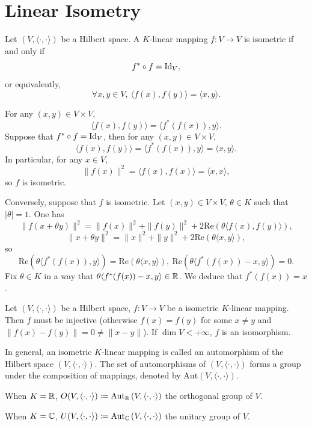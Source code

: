 \section{Linear Isometry}

\begin{propositionenv}
    Let $(V,\langle\cdot,\cdot\rangle)$ be a Hilbert space.
    A $K$-linear mapping $f : V\rightarrow V$ is isometric if and only if
    $$ f^*\circ f = \operatorname{\mathrm{Id}}_V,$$
    or equivalently, 
    $$ \forall x,y\in V, \ \langle f(x),f(y)\rangle = \langle x,y\rangle.$$
\end{propositionenv}
\begin{proofenv}
    For any $(x,y)\in V\times V$,
    $$ \langle f(x),f(y)\rangle = \langle f^*(f(x)),y\rangle .$$
    Suppose that $f^*\circ f = \operatorname{\mathrm{Id}}_V$, then for any $(x,y)\in V\times V$,
    $$ \langle f(x),f(y)\rangle = \langle f^*(f(x)),y\rangle = \langle x,y\rangle.$$
    In particular, for any $x\in V$, 
    $$ \| f(x)\|^2 = \langle f(x),f(x)\rangle = \langle x,x\rangle,$$
    so $f$ is isometric.

    \quad Conversely, suppose that $f$ is isometric.
    Let $(x,y)\in V\times V$, $\theta \in K$ such that $|\theta| = 1$.
    One has
    $$ \|f(x+\theta y)\|^2 = \|f(x)\|^2 + \|f(y)\|^2 + 2 \mathrm{Re} \left(\theta \langle f(x),f(y)\rangle\right),$$
    $$ \| x+ \theta y\|^2 = \|x\|^2 + \|y \|^2 + 2 \mathrm{Re} \left(\theta \langle x,y\rangle\right),$$
    so 
    $$ \mathrm{Re} \left(\theta \langle f^*(f(x)),y \rangle\right) = \mathrm{Re}(\theta\langle x,y\rangle),\ \mathrm{Re} \left(\theta \langle f^*(f(x)) - x,y\rangle\right) = 0.$$
    Fix $\theta\in K$ in a way that $\theta \langle f^*(f(x)) - x,y\rangle \in \mathbb{R}$.
    We deduce that $f^*(f(x)) = x$.
\end{proofenv}

\begin{remark}
    Let $(V,\langle\cdot,\cdot\rangle)$ be a Hilbert space,
    $f: V\rightarrow V$ be a isometric $K$-linear mapping.
    Then $f$ must be injective (otherwise $f(x) = f(y)$ for some $x\neq y$ and $\| f(x) - f(y)\| = 0 \neq \|x - y\|$).
    If $\dim V < +\infty$, $f$ is an isomorphism.
    
    \quad In general, an isometric $K$-linear mapping is called an automorphism of the Hilbert space $\left(V, \langle\cdot, \cdot\rangle\right)$.
    The set of automorphisms of $\left(V, \langle\cdot, \cdot\rangle\right)$ forms a group under the composition of mappings, denoted by $\mathrm{Aut}\left(V, \langle\cdot, \cdot\rangle\right)$.
    
    \quad When $K = \mathbb{R}$, $O(V,\langle\cdot,\cdot\rangle)\coloneq\mathrm{Aut}_{\mathbb{R}} \left(V, \langle\cdot, \cdot\rangle\right)$ the orthogonal group of $V$.
    
    \quad When $K = \mathbb{C}$, $U(V,\langle\cdot,\cdot\rangle)\coloneq\mathrm{Aut}_{\mathbb{C}} \left(V, \langle\cdot, \cdot\rangle\right)$ the unitary group of $V$.
\end{remark}

